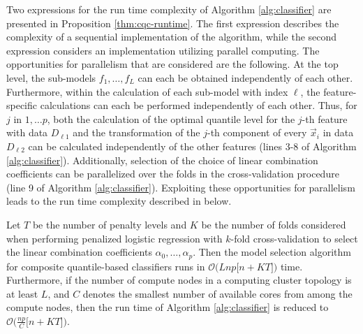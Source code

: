 Two expressions for the run time complexity of Algorithm \ref{alg:classifier}
are presented in Proposition \ref{thm:cqc-runtime}.  The first expression
describes the complexity of a sequential implementation of the algorithm, while
the second expression considers an implementation utilizing parallel computing.
The opportunities for parallelism that are considered are the following.  At the
top level, the sub-models $f_1, \dots, f_L$ can each be obtained independently
of each other.  Furthermore, within the calculation of each sub-model with index
$\ell$, the feature-specific calculations can each be performed independently of
each other.  Thus, for $j$ in $1, \dots p$, both the calculation of the optimal
quantile level for the $j$-th feature with data $D_{\ell 1}$ and the
transformation of the $j$-th component of every $\vec{x}_i$ in data $D_{\ell 2}$
can be calculated independently of the other features (lines 3-8 of Algorithm
\ref{alg:classifier}).  Additionally, selection of the choice of linear
combination coefficients can be parallelized over the folds in the
cross-validation procedure (line 9 of Algorithm \ref{alg:classifier}).
Exploiting these opportunities for parallelism leads to the run time complexity
described in below.

\begin{proposition}
  \label{thm:cqc-runtime}
  Let $T$ be the number of penalty levels and $K$ be the number of folds
  considered when performing penalized logistic regression with $k$-fold
  cross-validation to select the linear combination coefficients
  $\alpha_0, \dots, \alpha_p$.  Then the model selection algorithm for composite
  quantile-based classifiers runs in
  $\mathcal{O}\Big( Lnp \big[ n + KT \big]\Big)$ time.  Furthermore, if the
  number of compute nodes in a computing cluster topology is at least $L$, and
  $C$ denotes the smallest number of available cores from among the compute
  nodes, then the run time of Algorithm \ref{alg:classifier} is reduced to
  $\mathcal{O}\Big( \frac{np}{C} \big[ n + KT \big] \Big)$.
\end{proposition}


